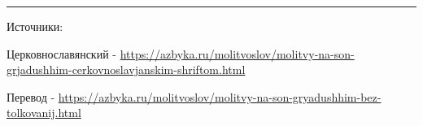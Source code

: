 \documentclass[12pt]{article}
\begin{document}
\pagestyle{empty}
\sloppy
\fontsize{14pt}{17pt}\selectfont


\vfill
{%
\translationfont\fontsize{5pt}{7pt}\selectfont
\setlength{\parskip}{0pt}
\noindent\rule{\linewidth}{0.4pt}\par
\vspace{0.35em}
\noindent\hspace*{2em}Источники: \par
\noindent\hspace*{2em}Церковнославянский - \url{https://azbyka.ru/molitvoslov/molitvy-na-son-grjadushhim-cerkovnoslavjanskim-shriftom.html}\par
\noindent\hspace*{2em}Перевод - \url{https://azbyka.ru/molitvoslov/molitvy-na-son-gryadushhim-bez-tolkovanij.html}\par
}
\end{document}
